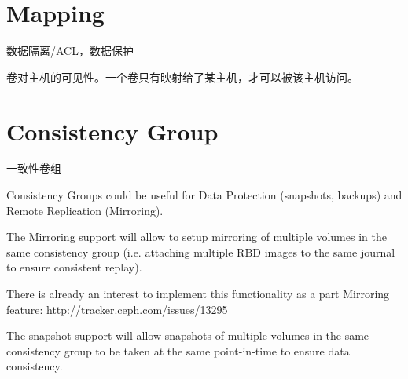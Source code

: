\section{Mapping}

数据隔离/ACL，数据保护

卷对主机的可见性。一个卷只有映射给了某主机，才可以被该主机访问。


\section{Consistency Group}

一致性卷组

\begin{shadequote}
Consistency Groups could be useful for Data Protection (snapshots, backups) and
Remote Replication (Mirroring).

The Mirroring support will allow to setup mirroring of multiple volumes in the
same consistency group (i.e. attaching multiple RBD images to the same journal
to ensure consistent replay).

There is already an interest to implement this functionality as a part Mirroring feature:
http://tracker.ceph.com/issues/13295

The snapshot support will allow snapshots of multiple volumes in the same
consistency group to be taken at the same point-in-time to ensure data
consistency.
\end{shadequote}

